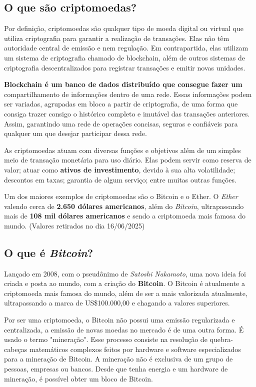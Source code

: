 \subsection{\textbf{O que são criptomoedas?}}

Por definição, criptomoedas são qualquer tipo de moeda digital ou virtual que utiliza criptografia para garantir a realização de transações. Elas não têm autoridade central de emissão e nem regulação. Em contrapartida, elas utilizam um sistema de criptografia chamado de blockchain, além de outros sistemas de criptografia descentralizados para registrar transações e emitir novas unidades. 

\textbf{Blockchain é um banco de dados distribuído que consegue fazer um} compartilhamento de informações dentro de uma rede. Essas informações podem ser variadas, agrupadas em bloco a partir de criptografia, de uma forma que consiga trazer consigo o histórico completo e imutável das transações anteriores. Assim, garantindo uma rede de operações concisas, seguras e confiáveis para qualquer um que desejar participar dessa rede.

As criptomoedas atuam com diversas funções e objetivos além de um simples meio de transação monetária para uso diário. Elas podem servir como reserva de valor; atuar como \textbf{ativos de investimento}, devido à sua alta volatilidade; descontos em taxas; garantia de algum serviço; entre muitas outras funções.

Um dos maiores exemplos de criptomoedas são o Bitcoin e o Ether. O \textit{Ether} valendo cerca de \textbf{2.650 dólares americanos}, além do \textit{Bitcoin}, ultrapassando mais de \textbf{108 mil dólares americanos} e sendo a criptomoeda mais famosa do mundo. (Valores retirados no dia 16/06/2025)
\subsection{\textbf{O que é \textit{Bitcoin}?}}

Lançado em 2008, com o pseudônimo de \textit{Satoshi Nakamoto}, uma nova ideia foi criada e posta ao mundo, com a criação do \textbf{Bitcoin}. O Bitcoin é atualmente a criptomoeda mais famosa do mundo, além de ser a mais valorizada atualmente, ultrapassando a marca de US\$100.000,00 e chagando a valores superiores.

Por ser uma criptomoeda, o Bitcoin não possui uma emissão regularizada e centralizada, a emissão de novas moedas no mercado é de uma outra forma. É usado o termo "mineração". Esse processo consiste na resolução de quebra-cabeças matemáticos complexos feitos por hardware e software especializados para a mineração de Bitcoin. A mineração não é exclusiva de um grupo de pessoas, empresas ou bancos. Desde que tenha energia e um hardware de mineração, é possível obter um bloco de Bitcoin.

